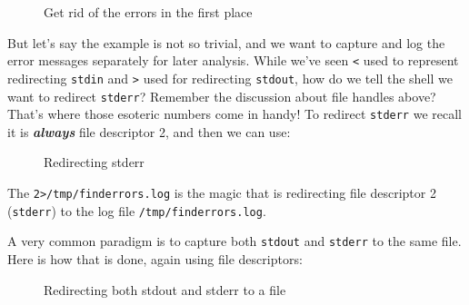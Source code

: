 \documentclass[10pt,american,]{book}
\newenvironment{Shaded}{\begin{snugshade}}{\end{snugshade}}
\newcommand{\KeywordTok}[1]{\textcolor[rgb]{0.13,0.29,0.53}{\textbf{{#1}}}}
\newcommand{\DataTypeTok}[1]{\textcolor[rgb]{0.13,0.29,0.53}{{#1}}}
\newcommand{\NormalTok}[1]{{#1}}
\numberwithin{figure}{chapter}
\DeclareRobustCommand{\drcap}[1]{\begin{figure}[H]\caption{#1}\end{figure}}
\renewcommand{\KeywordTok}[1]{{#1}}
\renewcommand{\DataTypeTok}[1]{{#1}}
\renewcommand{\NormalTok}[1]{{#1}}
\begin{document}
\drcap{Get rid of the errors in the first place}

\begin{Shaded}
\end{Shaded}

But let's say the example is not so trivial, and we want to capture and
log the error messages separately for later analysis. While we've seen
\texttt{\textless{}} used to represent redirecting \texttt{stdin} and
\texttt{\textgreater{}} used for redirecting \texttt{stdout}, how do we
tell the shell we want to redirect \texttt{stderr}? Remember the
discussion about file handles above? That's where those esoteric numbers
come in handy! To redirect \texttt{stderr} we recall it is
\textbf{\emph{always}} file descriptor 2, and then we can use:

\drcap{Redirecting stderr}

\begin{Shaded}
\end{Shaded}

The \texttt{2\textgreater{}/tmp/finderrors.log} is the magic that is
redirecting file descriptor 2 (\texttt{stderr}) to the log file
\texttt{/tmp/finderrors.log}.

A very common paradigm is to capture both \texttt{stdout} and
\texttt{stderr} to the same file. Here is how that is done, again using
file descriptors:

\drcap{Redirecting both stdout and stderr to a file}

\begin{Shaded}
\end{Shaded}
\end{document}

